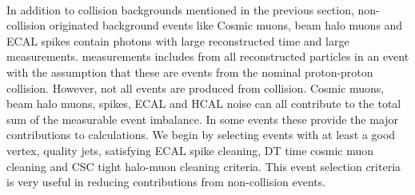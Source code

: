 \paragraph*{}
In addition to collision backgrounds mentioned in the previous section, non-collision originated background events like Cosmic muons, beam halo muons and ECAL spikes  contain photons with large reconstructed time and large \MET measurements. \MET measurements includes \pt from all reconstructed particles in an event with the assumption that  these are events from the nominal proton-proton collision. However, not all events are produced from collision. Cosmic muons, beam halo muons, spikes, ECAL and HCAL noise can all contribute to the total sum of the measurable event \pt imbalance. In some events these provide the major contributions to \MET calculations. 
We begin by selecting events with at least a good vertex, quality jets, satisfying ECAL spike cleaning, DT time cosmic muon cleaning and CSC tight halo-muon cleaning criteria. This event selection criteria is very useful in reducing contributions from non-collision events.


